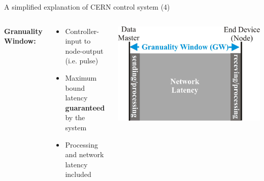 \documentclass[compress,red]{beamer}
\begin{document}
\begin{frame}{A simplified explanation of CERN control system (4)}

\begin{columns}[c]
   {\bf Granuality Window: }
    \begin{center}
      \begin{itemize}
	    \item Controller-input to node-output (i.e. pulse)
	    \item Maximum bound latency {\bf guaranteed } by the system
	    \item Processing and network latency included
      \end{itemize}

    \end{center}
    \begin{center}
      \begin{center}
      \includegraphics[width=.8\textwidth]{applications/CERN/gw.pdf}
      \end{center}
    \end{center}
\end{columns}

\end{frame}
\end{document}
